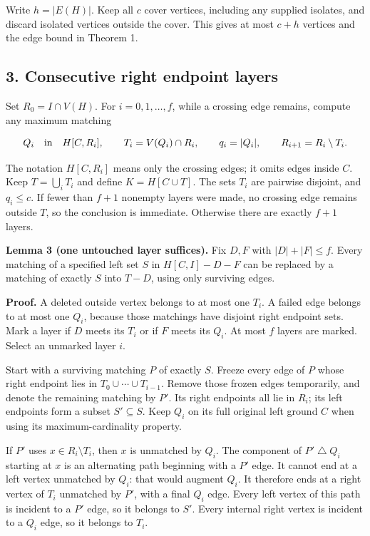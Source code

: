 Write \(h=|E(H)|\). Keep all \(c\) cover vertices, including any supplied isolates, and discard isolated vertices outside the cover. This gives at most \(c+h\) vertices and the edge bound in Theorem 1.

\hypertarget{af-321c79486f-consecutive-right-endpoint-layers}{%
\subsection{3. Consecutive right endpoint layers}\label{af-321c79486f-consecutive-right-endpoint-layers}}

Set \(R_0=I\cap V(H)\). For \(i=0,1,\ldots,f\), while a crossing edge remains, compute any maximum matching

\[
Q_i\quad\hbox{in}\quad H[C,R_i],\qquad
T_i=V(Q_i)\cap R_i,\qquad q_i=|Q_i|,
\qquad R_{i+1}=R_i\setminus T_i.
\]

The notation \(H[C,R_i]\) means only the crossing edges; it omits edges inside \(C\). Keep \(T=\bigcup_iT_i\) and define \(K=H[C\cup T]\). The sets \(T_i\) are pairwise disjoint, and \(q_i\leq c\). If fewer than \(f+1\) nonempty layers were made, no crossing edge remains outside \(T\), so the conclusion is immediate. Otherwise there are exactly \(f+1\) layers.

\textbf{Lemma 3 (one untouched layer suffices).} Fix \(D,F\) with \(|D|+|F|\leq f\). Every matching of a specified left set \(S\) in \(H[C,I]-D-F\) can be replaced by a matching of exactly \(S\) into \(T-D\), using only surviving edges.

\textbf{Proof.} A deleted outside vertex belongs to at most one \(T_i\). A failed edge belongs to at most one \(Q_i\), because those matchings have disjoint right endpoint sets. Mark a layer if \(D\) meets its \(T_i\) or if \(F\) meets its \(Q_i\). At most \(f\) layers are marked. Select an unmarked layer \(i\).

Start with a surviving matching \(P\) of exactly \(S\). Freeze every edge of \(P\) whose right endpoint lies in \(T_0\cup\cdots\cup T_{i-1}\). Remove those frozen edges temporarily, and denote the remaining matching by \(P'\). Its right endpoints all lie in \(R_i\); its left endpoints form a subset \(S'\subseteq S\). Keep \(Q_i\) on its full original left ground \(C\) when using its maximum-cardinality property.

If \(P'\) uses \(x\in R_i\setminus T_i\), then \(x\) is unmatched by \(Q_i\). The component of \(P'\mathbin{\triangle}Q_i\) starting at \(x\) is an alternating path beginning with a \(P'\) edge. It cannot end at a left vertex unmatched by \(Q_i\): that would augment \(Q_i\). It therefore ends at a right vertex of \(T_i\) unmatched by \(P'\), with a final \(Q_i\) edge. Every left vertex of this path is incident to a \(P'\) edge, so it belongs to \(S'\). Every internal right vertex is incident to a \(Q_i\) edge, so it belongs to \(T_i\).

